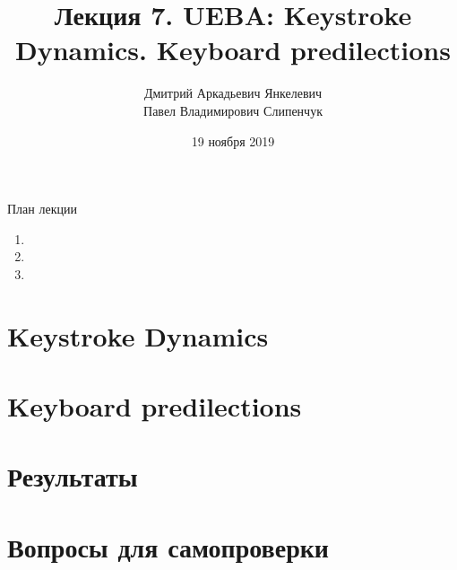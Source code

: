 


\title{Лекция 7. UEBA: Keystroke Dynamics. Keyboard predilections}

\date{19 ноября 2019}
\author{Дмитрий Аркадьевич Янкелевич \\ Павел Владимирович Слипенчук }


  \maketitle
    
\begin{frame}{План лекции}
    \begin{enumerate}
    	\item {}
		\item {}
		\item {}
	\end{enumerate}
\end{frame}

\section{Keystroke Dynamics}\label{section:kd}

\section{Keyboard predilections}\label{section:kp}

\section{Результаты}\label{section:goals}

\section{Вопросы для самопроверки}

